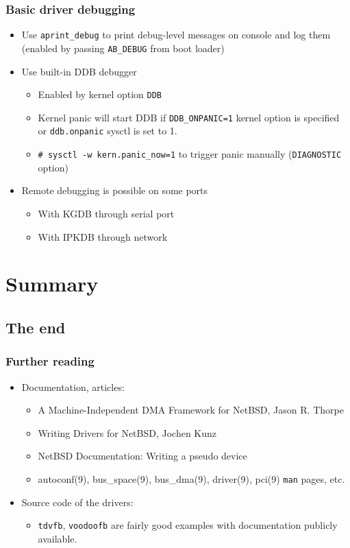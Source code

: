 \documentclass[dvipsnames,table]{beamer}
\begin{document}
\begin{frame}
\frametitle{Basic driver debugging} 
\begin{itemize}
	\item Use {\tt aprint\_debug} to print debug-level messages on console and log them (enabled by passing {\tt AB\_DEBUG} from boot loader)
	\item Use built-in DDB debugger
	\begin{itemize}
			\item Enabled by kernel option {\tt DDB}
			\item Kernel panic will start DDB if {\tt DDB\_ONPANIC=1} kernel option is specified or {\tt ddb.onpanic} sysctl is set to 1.
			\item {\tt \# sysctl -w kern.panic\_now=1} to trigger panic manually ({\tt DIAGNOSTIC} option)
	\end{itemize}	
	\item Remote debugging is possible on some ports
	\begin{itemize}
			\item With KGDB through serial port
			\item With IPKDB through network
	\end{itemize}	
\end{itemize}
\end{frame}

\section{Summary}
\subsection{The end}

\begin{frame}
\frametitle{Further reading}
\begin{itemize}
	\item Documentation, articles:
	\begin{itemize}
		\item A Machine-Independent DMA Framework for NetBSD, Jason R. Thorpe
		\item Writing Drivers for NetBSD, Jochen Kunz
		\item NetBSD Documentation: Writing a pseudo device
		\item autoconf(9), bus\_space(9), bus\_dma(9), driver(9), pci(9) {\tt man} pages, etc.
	\end{itemize}
	\item Source code of the drivers:
	\begin{itemize}
		\item {\tt tdvfb}, {\tt voodoofb} are fairly good examples with documentation publicly available.
	\end{itemize}
\end{itemize}

\end{frame}
\end{document}
